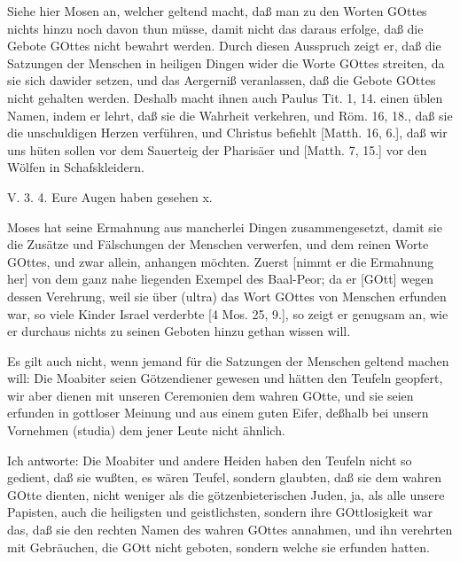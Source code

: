 Siehe hier Mosen an, welcher geltend macht, daß man zu den Worten GOttes nichts hinzu noch davon thun müsse, damit nicht das daraus erfolge, daß die Gebote GOttes nicht bewahrt werden. Durch diesen Ausspruch zeigt er, daß die Satzungen der Menschen in heiligen Dingen wider die Worte GOttes streiten, da sie sich dawider setzen, und das Aergerniß veranlassen, daß die Gebote GOttes nicht gehalten werden. Deshalb macht ihnen auch Paulus Tit. 1, 14. einen üblen Namen, indem er lehrt, daß sie die Wahrheit verkehren, und Röm. 16, 18., daß sie die unschuldigen Herzen verführen, und Christus befiehlt [Matth. 16, 6.], daß wir uns hüten sollen vor dem Sauerteig der Pharisäer und [Matth. 7, 15.] vor den Wölfen in Schafskleidern.

\begin{schriftzitat}
V. 3. 4. Eure Augen haben gesehen x.
\end{schriftzitat}

Moses hat seine Ermahnung aus mancherlei Dingen zusammengesetzt, damit sie die Zusätze und Fälschungen der Menschen verwerfen, und dem reinen Worte GOttes, und zwar allein, anhangen möchten. Zuerst [nimmt er die Ermahnung her] von dem ganz nahe liegenden Exempel des Baal-Peor; da er [GOtt] wegen dessen Verehrung, weil sie über (ultra) das Wort GOttes von Menschen erfunden war, so viele Kinder Israel verderbte [4 Mos. 25, 9.], so zeigt er genugsam an, wie er durchaus nichts zu seinen Geboten hinzu gethan wissen will.

Es gilt auch nicht, wenn jemand für die Satzungen der Menschen geltend machen will: Die Moabiter seien Götzendiener gewesen und hätten den Teufeln geopfert, wir aber dienen mit unseren Ceremonien dem wahren GOtte, und sie seien erfunden in gottloser Meinung und aus einem guten Eifer, deßhalb bei unsern Vornehmen (studia) dem jener Leute nicht ähnlich.

Ich antworte: Die Moabiter und andere Heiden haben den Teufeln nicht so gedient, daß sie wußten, es wären Teufel, sondern glaubten, daß sie dem wahren GOtte dienten, nicht weniger als die götzenbieterischen Juden, ja, als alle unsere Papisten, auch die heiligsten und geistlichsten, sondern ihre GOttlosigkeit war das, daß sie den rechten Namen des wahren GOttes annahmen, und ihn verehrten mit Gebräuchen, die GOtt nicht geboten, sondern welche sie erfunden hatten.

